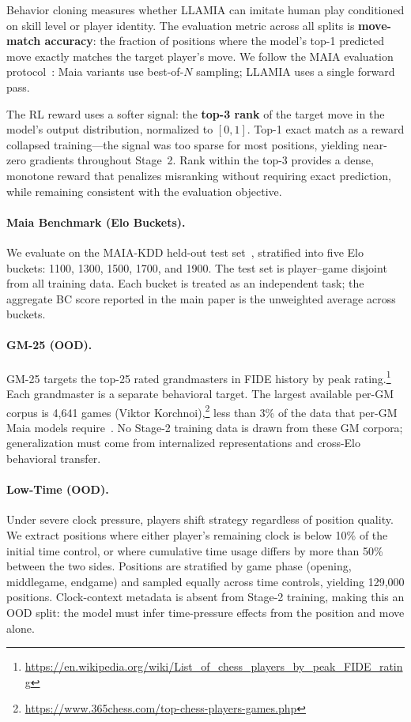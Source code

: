 Behavior cloning measures whether LLAMIA can imitate human play conditioned on skill level or player identity. The evaluation metric across all splits is \textbf{move-match accuracy}: the fraction of positions where the model's top-1 predicted move exactly matches the target player's move. We follow the MAIA evaluation protocol~\citep{mcilroy2020aligning}: Maia variants use best-of-$N$ sampling; LLAMIA uses a single forward pass.

The RL reward uses a softer signal: the \textbf{top-3 rank} of the target move in the model's output distribution, normalized to $[0,1]$. Top-1 exact match as a reward collapsed training---the signal was too sparse for most positions, yielding near-zero gradients throughout Stage~2. Rank within the top-3 provides a dense, monotone reward that penalizes misranking without requiring exact prediction, while remaining consistent with the evaluation objective.

\paragraph{Maia Benchmark (Elo Buckets).}
\label{sec:app_bench_bc_maia}
We evaluate on the MAIA-KDD held-out test set~\citep{mcilroy2020aligning}, stratified into five Elo buckets: 1100, 1300, 1500, 1700, and 1900. The test set is player--game disjoint from all training data. Each bucket is treated as an independent task; the aggregate BC score reported in the main paper is the unweighted average across buckets.

\paragraph{GM-25 (OOD).}
\label{sec:app_bench_bc_gm}
GM-25 targets the top-25 rated grandmasters in FIDE history by peak rating.\footnote{\url{https://en.wikipedia.org/wiki/List_of_chess_players_by_peak_FIDE_rating}} Each grandmaster is a separate behavioral target. The largest available per-GM corpus is 4,641 games (Viktor Korchnoi),\footnote{\url{https://www.365chess.com/top-chess-players-games.php}} less than 3\% of the data that per-GM Maia models require~\citep{mcilroy2020aligning}. No Stage-2 training data is drawn from these GM corpora; generalization must come from internalized representations and cross-Elo behavioral transfer.

\paragraph{Low-Time (OOD).}
\label{sec:app_bench_bc_time}
Under severe clock pressure, players shift strategy regardless of position quality. We extract positions where either player's remaining clock is below 10\% of the initial time control, or where cumulative time usage differs by more than 50\% between the two sides. Positions are stratified by game phase (opening, middlegame, endgame) and sampled equally across time controls, yielding 129,000 positions. Clock-context metadata is absent from Stage-2 training, making this an OOD split: the model must infer time-pressure effects from the position and move alone.

